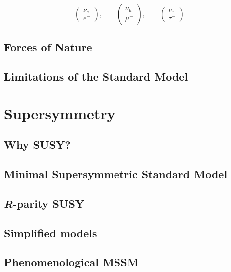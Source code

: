 				\begin{equation*}
				\label{eqn:lepton_flavor_doublets}
					\begin{pmatrix} \nu_e      \\ e^-    \end{pmatrix}, \qquad
					\begin{pmatrix} \nu_{\mu}  \\ \mu^-  \end{pmatrix}, \qquad
					\begin{pmatrix} \nu_{\tau} \\ \tau^- \end{pmatrix}
				\end{equation*}


				



			\subsection*{Forces of Nature}	



		\subsection{Limitations of the Standard Model}
		\label{sec:SMlim}





	\section{Supersymmetry}
	\label{sec:SUSY}

		\subsection{Why SUSY?}

		\subsection{Minimal Supersymmetric Standard Model}

		\subsection{\emph{R}-parity SUSY}
		
		\subsection{Simplified models}

		\subsection{Phenomenological MSSM}
